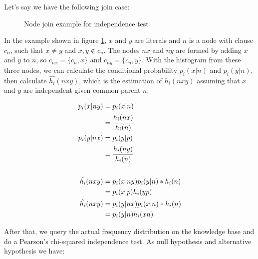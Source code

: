 Let's say we have the following join case:
 
\begin{figure}[!h]
  \caption{Node join example for independence test}
  \centering
  \label{fig:joinIndepExample}
\end{figure}

In the example shown in figure \ref{fig:joinIndepExample}, $x$ and $y$ are literals and $n$ is a node with clause $c_n$,
such that $x \neq y$ and $x,y \not \in c_n$. The nodes $nx$ and $ny$ are formed by adding $x$ and $y$ to $n$, so
$c_{nx}=\{c_n,x\}$ and $c_{ny}=\{c_n,y\}$. With the histogram from these three nodes, we can calculate the conditional
probability $p_i(x|n)$ and $p_i(y|n)$, then calculate $\hat{h_i}(nxy)$, which is the estimation of
$h_i(nxy)$ assuming that $x$ and $y$ are independent given common parent $n$.

\begin{align*}
\label{eq:condindep}
 p_i(x|ny) &= p_i(x|n) \\ 
 &= \cfrac{h_i(nx)}{h_i(n)} \\ 
 p_i(y|nx) &= p_i(y|p) \\ 
 &= \cfrac{h_i(ny)}{h_i(n)} \\ \\ 
 \hat{h_i}(nxy) &= p_i(x|ny)p_i(y|n)*h_i(n) \\ 
 &= p_i(x|p)h_i(yp) \\ 
 \hat{h_i}(nxy) &= p_i(y|nx)p_i(x|n)*h_i(n) \\ 
 &= p_i(y|n)h_i(xn)
\end{align*}

After that, we query the actual frequency distribution on the knowledge base and do a Pearson's chi-squared
independence test. As null hypothesis and alternative hypothesis we have:


